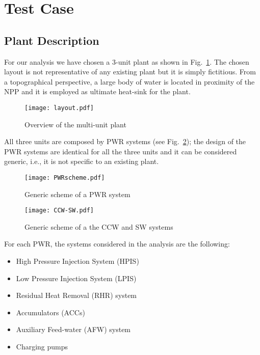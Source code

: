 \section{Test Case}
\label{sec:testCase}

\subsection{Plant Description}
For our analysis we have chosen a 3-unit plant as shown in Fig.~\ref{fig:layout}. The chosen layout 
is not representative of any existing plant but it is simply fictitious.
From a topographical perspective, a large body of water is located in proximity of the NPP and it is 
employed as ultimate heat-sink for the plant.

\begin{figure}
    \centering
    \texttt{[image: layout.pdf]}
    \caption{Overview of the multi-unit plant}
    \label{fig:layout}
\end{figure}

All three units are composed by PWR systems (see Fig.~\ref{fig:PWRscheme}); the design of the PWR systems 
are identical for all the three units and it 
can be considered generic, i.e., it is not specific to an existing plant. 

\begin{figure}
    \centering
    \texttt{[image: PWRscheme.pdf]}
    \caption{Generic scheme of a PWR system}
    \label{fig:PWRscheme}
\end{figure}

\begin{figure}
    \centering
    \texttt{[image: CCW-SW.pdf]}
    \caption{Generic scheme of a the CCW and SW systems}
    \label{fig:CCW-SWscheme}
\end{figure}

For each PWR, the systems considered in the analysis are the following:
\begin{itemize}
  \item High Pressure Injection System (HPIS)
  \item Low Pressure Injection System (LPIS)
  \item Residual Heat Removal (RHR) system
  \item Accumulators (ACCs)
  \item Auxiliary Feed-water (AFW) system 
  \item Charging pumps
\end{itemize}


